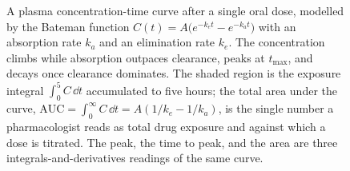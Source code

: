 \begin{figure}[htbp]
\centering
{}
\caption[Concentration-time curve and area under the curve]{A plasma
concentration-time curve after a single oral dose, modelled by the
Bateman function $C(t) = A\bigl(e^{-k_{e}t} - e^{-k_{a}t}\bigr)$ with an
absorption rate $k_{a}$ and an elimination rate $k_{e}$. The
concentration climbs while absorption outpaces clearance, peaks at
$t_{\max}$, and decays once clearance dominates. The shaded region is
the exposure integral $\int_{0}^{5} C\,\dd t$ accumulated to five hours;
the total area under the curve, $\mathrm{AUC} = \int_{0}^{\infty}
C\,\dd t = A(1/k_{e} - 1/k_{a})$, is the single number a pharmacologist
reads as total drug exposure and against which a dose is titrated. The
peak, the time to peak, and the area are three integrals-and-derivatives
readings of the same curve.}
\label{fig:vol02ch06:drug-auc}
\end{figure}
